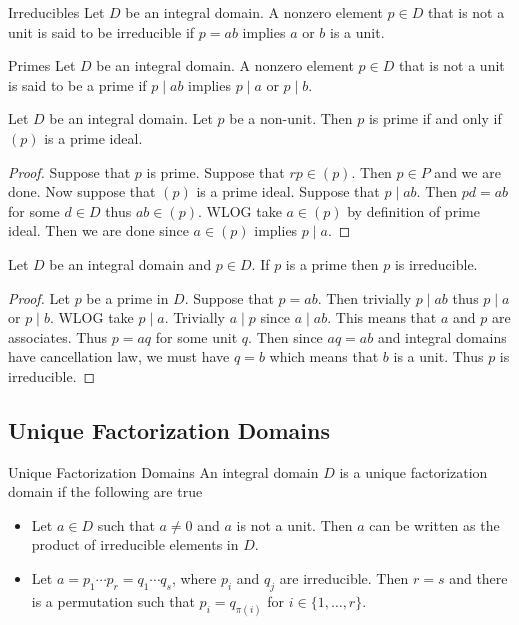 \documentclass[a4paper]{article}
\begin{document}
\begin{defn}{Irreducibles}{} Let $D$ be an integral domain. A nonzero element $p\in D$ that is not a unit is said to be irreducible if $p=ab$ implies $a$ or $b$ is a unit. 
\end{defn}

\begin{defn}{Primes}{} Let $D$ be an integral domain. A nonzero element $p\in D$ that is not a unit is said to be a prime if $p\;|\;ab$ implies $p\;|\;a$ or $p\;|\;b$. 
\end{defn}

\begin{lmm}{}{} Let $D$ be an integral domain. Let $p$ be a non-unit. Then $p$ is prime if and only if $(p)$ is a prime ideal. 
\begin{proof}
Suppose that $p$ is prime. Suppose that $rp\in(p)$. Then $p\in P$ and we are done. Now suppose that $(p)$ is a prime ideal. Suppose that $p\;|\;ab$. Then $pd=ab$ for some $d\in D$ thus $ab\in(p)$. WLOG take $a\in(p)$ by definition of prime ideal. Then we are done since $a\in(p)$ implies $p\;|\;a$. 
\end{proof}
\end{lmm}

\begin{prp}{}{} Let $D$ be an integral domain and $p\in D$. If $p$ is a prime then $p$ is irreducible. 
\begin{proof}
Let $p$ be a prime in $D$. Suppose that $p=ab$. Then trivially $p\;|\;ab$ thus $p\;|\;a$ or $p\;|\;b$. WLOG take $p\;|\;a$. Trivially $a\;|\;p$ since $a\;|\;ab$. This means that $a$ and $p$ are associates. Thus $p=aq$ for some unit $q$. Then since $aq=ab$ and integral domains have cancellation law, we must have $q=b$ which means that $b$ is a unit. Thus $p$ is irreducible. 
\end{proof}
\end{prp}

\subsection{Unique Factorization Domains}
\begin{defn}{Unique Factorization Domains}{} An integral domain $D$ is a unique factorization domain if the following are true
\begin{itemize}
\item Let $a\in D$ such that $a\neq 0$ and $a$ is not a unit. Then $a$ can be written as the product of irreducible elements in $D$. 
\item Let $a=p_1\cdots p_r=q_1\cdots q_s$, where $p_i$ and $q_j$ are irreducible. Then $r=s$ and there is a permutation such that $p_i=q_{\pi(i)}$ for $i\in\{1,\dots,r\}$. 
\end{itemize}
\end{defn}
\end{document}
